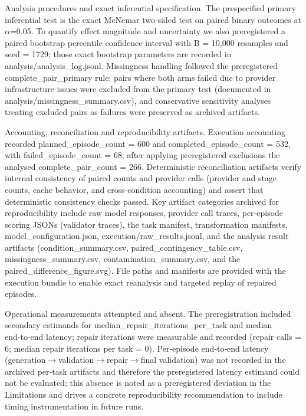 \documentclass[conference]{IEEEtran}
\begin{document}
Analysis procedures and exact inferential specification.  The prespecified primary inferential test is the exact McNemar two‑sided test on paired binary outcomes at \ensuremath{\alpha}=0.05. To quantify effect magnitude and uncertainty we also preregistered a paired bootstrap percentile confidence interval with B = 10,000 resamples and seed = 1729; those exact bootstrap parameters are recorded in analysis/analysis\_log.jsonl. Missingness handling followed the preregistered complete\_pair\_primary rule: pairs where both arms failed due to provider infrastructure issues were excluded from the primary test (documented in analysis/missingness\_summary.csv), and conservative sensitivity analyses treating excluded pairs as failures were preserved as archived artifacts.

Accounting, reconciliation and reproducibility artifacts.  Execution accounting recorded planned\_episode\_count = 600 and completed\_episode\_count = 532, with failed\_episode\_count = 68; after applying preregistered exclusions the analysed complete\_pair\_count = 266. Deterministic reconciliation artifacts verify internal consistency of paired counts and provider calls (provider and stage counts, cache behavior, and cross‑condition accounting) and assert that deterministic consistency checks passed. Key artifact categories archived for reproducibility include raw model responses, provider call traces, per‑episode scoring JSONs (validator traces), the task manifest, transformation manifests, model\_configuration.json, execution/raw\_results.jsonl, and the analysis result artifacts (condition\_summary.csv, paired\_contingency\_table.csv, missingness\_summary.csv, contamination\_summary.csv, and the paired\_difference\_figure.svg). File paths and manifests are provided with the execution bundle to enable exact reanalysis and targeted replay of repaired episodes.

Operational measurements attempted and absent.  The preregistration included secondary estimands for median\_repair\_iterations\_per\_task and median end‑to‑end latency; repair iterations were measurable and recorded (repair calls = 6; median repair iterations per task = 0). Per‑episode end‑to‑end latency (generation\ensuremath{\rightarrow}validation\ensuremath{\rightarrow}repair\ensuremath{\rightarrow}final validation) was not recorded in the archived per‑task artifacts and therefore the preregistered latency estimand could not be evaluated; this absence is noted as a preregistered deviation in the Limitations and drives a concrete reproducibility recommendation to include timing instrumentation in future runs.
\end{document}
